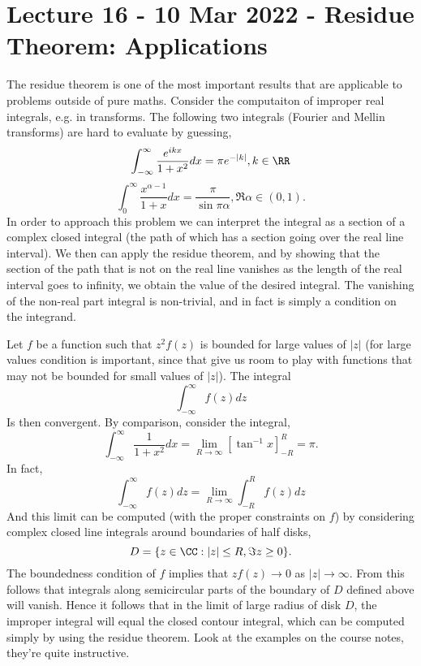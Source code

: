 \section{Lecture 16 - 10 Mar 2022 - Residue Theorem: Applications}
The residue theorem is one of the most important results that are applicable to
problems outside of pure maths. Consider the computaiton of improper real
integrals, e.g. in transforms. The following two integrals (Fourier and Mellin
transforms) are hard to evaluate by guessing,
\[\int_{-\infty}^{\infty} \frac{e^{ikx}}{1+x^2} dx = \pi e^{-|k|}, k\in\RR\]
\[\int_{0}^{\infty} \frac{x^{\alpha-1}}{1+x}dx =\frac{\pi}{\sin \pi\alpha},
\Re\alpha\in (0,1).\]
In order to approach this problem we can interpret the integral as a section of
a complex closed integral (the path of which has a section going over the real
line interval). We then can apply the residue theorem, and by showing that the
section of the path that is not on the real line vanishes as the length of
the real interval goes to infinity, we obtain the value of the desired integral.
The vanishing of the non-real part integral is non-trivial, and in fact is
simply a condition on the integrand. 

Let $f$ be a function such that $z^2 f(z)$ is bounded for large values of $|z|$
(for large values condition is important, since that give us room to play with
functions that may not be bounded for small values of $|z|$). The integral
\[\int_{-\infty}^{\infty} f(z) dz\]
Is then convergent. By comparison, consider the integral, 
\[\int_{-\infty}^{\infty} \frac{1}{1+x^2}dx =
\lim_{R\to\infty}[\tan^{-1}x]_{-R}^{R} = \pi.\]
In fact, 
\[\int_{-\infty}^{\infty} f(z)dz =\lim_{R\to\infty}\int_{-R}^{R} f(z)dz\]
And this limit can be computed (with the proper constraints on $f$) by
considering complex closed line integrals around boundaries of half disks, 
\[D=\{z\in\CC : |z|\leq R, \Im z \geq 0\}.\]
The boundedness condition of $f$ implies that $zf(z)\to 0$ as $|z|\to \infty$.
From this follows that integrals along semicircular parts of the boundary of $D$
defined above will vanish. Hence it follows that in the limit of large radius of
disk $D$, the improper integral will equal the closed contour integral, which
can be computed simply by using the residue theorem. Look at the examples on the
course notes, they're quite instructive. 

